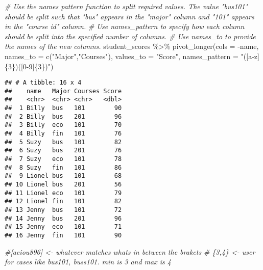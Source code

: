 \documentclass[
]{article}
\newenvironment{Shaded}{\begin{snugshade}}{\end{snugshade}}
\newcommand{\AttributeTok}[1]{\textcolor[rgb]{0.77,0.63,0.00}{#1}}
\newcommand{\CommentTok}[1]{\textcolor[rgb]{0.56,0.35,0.01}{\textit{#1}}}
\newcommand{\FunctionTok}[1]{\textcolor[rgb]{0.00,0.00,0.00}{#1}}
\newcommand{\NormalTok}[1]{#1}
\newcommand{\SpecialCharTok}[1]{\textcolor[rgb]{0.00,0.00,0.00}{#1}}
\newcommand{\StringTok}[1]{\textcolor[rgb]{0.31,0.60,0.02}{#1}}
\begin{document}
\begin{Shaded}
\begin{Highlighting}[]
\CommentTok{\# Use the names pattern function to split required values. The value "bus101" should be split such that "bus" appears in the "major" column and "101" appears in the "course id" column.}
\CommentTok{\# Use names\_pattern to specify how each column should be split into the specified number of columns.}
\CommentTok{\# Use names\_to to provide the names of the new columns. }
\NormalTok{student\_scores }\SpecialCharTok{\%\textgreater{}\%}
\FunctionTok{pivot\_longer}\NormalTok{(}\AttributeTok{cols =} \SpecialCharTok{{-}}\NormalTok{name,}
             \AttributeTok{names\_to =} \FunctionTok{c}\NormalTok{(}\StringTok{"Major"}\NormalTok{,}\StringTok{"Courses"}\NormalTok{),}
             \AttributeTok{values\_to =} \StringTok{"Score"}\NormalTok{,}
             \AttributeTok{names\_pattern =} \StringTok{"([a{-}z]\{3\})([0{-}9]\{3\})"}\NormalTok{)}
\end{Highlighting}
\end{Shaded}

\begin{verbatim}
## # A tibble: 16 x 4
##    name   Major Courses Score
##    <chr>  <chr> <chr>   <dbl>
##  1 Billy  bus   101        90
##  2 Billy  bus   201        96
##  3 Billy  eco   101        70
##  4 Billy  fin   101        76
##  5 Suzy   bus   101        82
##  6 Suzy   bus   201        76
##  7 Suzy   eco   101        78
##  8 Suzy   fin   101        86
##  9 Lionel bus   101        68
## 10 Lionel bus   201        56
## 11 Lionel eco   101        79
## 12 Lionel fin   101        82
## 13 Jenny  bus   101        72
## 14 Jenny  bus   201        96
## 15 Jenny  eco   101        71
## 16 Jenny  fin   101        90
\end{verbatim}

\begin{Shaded}
\begin{Highlighting}[]
\CommentTok{\#[aeiou896] \textless{}{-} whatever matches what\textquotesingle{}s in between the brakets}
\CommentTok{\# \{3,4\} \textless{}{-} user for cases like bus101, buss101. min is 3 and max is 4}
\end{Highlighting}
\end{Shaded}
\end{document}
